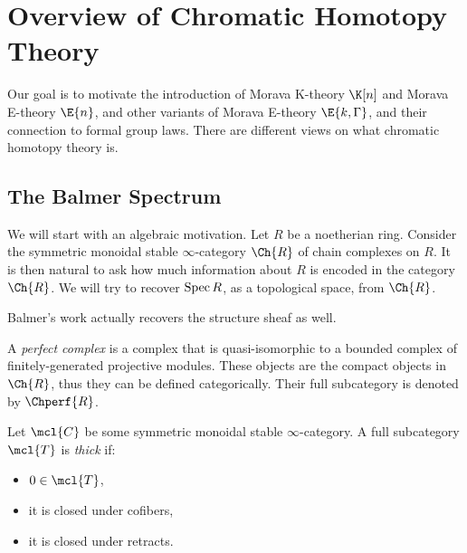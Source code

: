 \section{Overview of Chromatic Homotopy Theory}

Our goal is to motivate the introduction of Morava K-theory $\K[n]$ and Morava E-theory $\E{n}$, and other variants of Morava E-theory $\E{k,\Gamma}$, and their connection to formal group laws.
There are different views on what chromatic homotopy theory is.



\subsection{The Balmer Spectrum}

We will start with an algebraic motivation.
Let $R$ be a noetherian ring.
Consider the symmetric monoidal stable $\infty$-category $\Ch{R}$ of chain complexes on $R$. 
It is then natural to ask how much information about $R$ is encoded in the category $\Ch{R}$.
We will try to recover $\operatorname{Spec} R$, as a topological space, from $\Ch{R}$.

\begin{remark}
	Balmer's work actually recovers the structure sheaf as well. 
\end{remark}

\begin{definition}
	A \emph{perfect complex} is a complex that is quasi-isomorphic to a bounded complex of finitely-generated projective modules.
	These objects are the compact objects in $\Ch{R}$, thus they can be defined categorically.
	Their full subcategory is denoted by $\Chperf{R}$.
\end{definition}

\begin{definition}
	Let $\mcl{C}$ be some symmetric monoidal stable $\infty$-category.
	A full subcategory $\mcl{T}$ is \emph{thick} if:
	\begin{itemize}
		\item $0 \in \mcl{T}$,
		\item it is closed under cofibers,
		\item it is closed under retracts.
	\end{itemize}
\end{definition}


